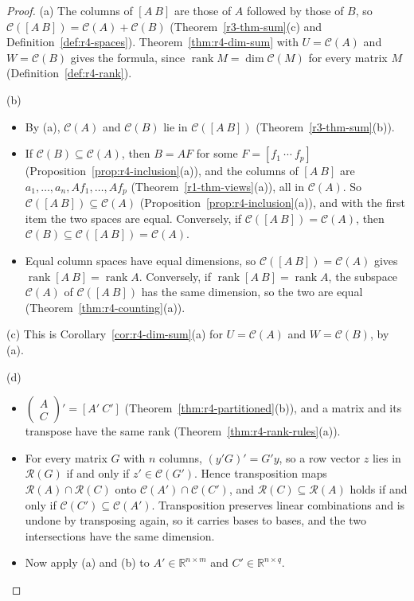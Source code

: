 \documentclass[12pt]{article}
\newcommand{\R}{\mathbb R}
\DeclareMathOperator{\rank}{rank}
\theoremstyle{definition}
\begin{document}
\begin{proof}
(a) The columns of \([A\ B]\) are those of \(A\) followed by those of \(B\), so
\(\mathcal C([A\ B])=\mathcal C(A)+\mathcal C(B)\) (Theorem~\ref{r3-thm-sum}(c) and Definition~\ref{def:r4-spaces}).
Theorem~\ref{thm:r4-dim-sum} with \(U=\mathcal C(A)\) and \(W=\mathcal C(B)\) gives the formula, since
\(\rank M=\dim\mathcal C(M)\) for every matrix \(M\) (Definition~\ref{def:r4-rank}).

(b)
\begin{itemize}
\item By (a), \(\mathcal C(A)\) and \(\mathcal C(B)\) lie in \(\mathcal C([A\ B])\) (Theorem~\ref{r3-thm-sum}(b)).
\item If \(\mathcal C(B)\subseteq\mathcal C(A)\), then \(B=AF\) for some \(F=[f_1\ \cdots\ f_p]\)
(Proposition~\ref{prop:r4-inclusion}(a)), and the columns of \([A\ B]\) are \(a_1,\dots,a_n,Af_1,\dots,Af_p\)
(Theorem~\ref{r1-thm-views}(a)), all in \(\mathcal C(A)\). So \(\mathcal C([A\ B])\subseteq\mathcal C(A)\)
(Proposition~\ref{prop:r4-inclusion}(a)), and with the first item the two spaces are equal. Conversely, if
\(\mathcal C([A\ B])=\mathcal C(A)\), then \(\mathcal C(B)\subseteq\mathcal C([A\ B])=\mathcal C(A)\).
\item Equal column spaces have equal dimensions, so \(\mathcal C([A\ B])=\mathcal C(A)\) gives
\(\rank[A\ B]=\rank A\). Conversely, if \(\rank[A\ B]=\rank A\), the subspace \(\mathcal C(A)\) of
\(\mathcal C([A\ B])\) has the same dimension, so the two are equal (Theorem~\ref{thm:r4-counting}(a)).
\end{itemize}
(c) This is Corollary~\ref{cor:r4-dim-sum}(a) for \(U=\mathcal C(A)\) and \(W=\mathcal C(B)\), by (a).

(d)
\begin{itemize}
\item \(\left(\begin{smallmatrix}A\\C\end{smallmatrix}\right)'=[A'\ C']\)
(Theorem~\ref{thm:r4-partitioned}(b)), and a matrix and its transpose have the same rank
(Theorem~\ref{thm:r4-rank-rules}(a)).
\item For every matrix \(G\) with \(n\) columns, \((y'G)'=G'y\), so a row vector \(z\) lies in \(\mathcal R(G)\) if and
only if \(z'\in\mathcal C(G')\). Hence transposition maps \(\mathcal R(A)\cap\mathcal R(C)\) onto
\(\mathcal C(A')\cap\mathcal C(C')\), and \(\mathcal R(C)\subseteq\mathcal R(A)\) holds if and only if
\(\mathcal C(C')\subseteq\mathcal C(A')\). Transposition preserves linear combinations and is undone by transposing
again, so it carries bases to bases, and the two intersections have the same dimension.
\item Now apply (a) and (b) to \(A'\in\R^{n\times m}\) and \(C'\in\R^{n\times q}\).\qedhere
\end{itemize}
\end{proof}
\end{document}
